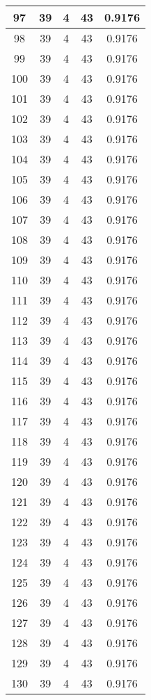 \documentclass[letterpaper, 12pt]{article}
\begin{document}
\begin{longtable}{|c|c|c|c|c|}
\hline
97 & 39 & 4 & 43 & 0.9176 \\
\hline
98 & 39 & 4 & 43 & 0.9176 \\
\hline
99 & 39 & 4 & 43 & 0.9176 \\
\hline
100 & 39 & 4 & 43 & 0.9176 \\
\hline
101 & 39 & 4 & 43 & 0.9176 \\
\hline
102 & 39 & 4 & 43 & 0.9176 \\
\hline
103 & 39 & 4 & 43 & 0.9176 \\
\hline
104 & 39 & 4 & 43 & 0.9176 \\
\hline
105 & 39 & 4 & 43 & 0.9176 \\
\hline
106 & 39 & 4 & 43 & 0.9176 \\
\hline
107 & 39 & 4 & 43 & 0.9176 \\
\hline
108 & 39 & 4 & 43 & 0.9176 \\
\hline
109 & 39 & 4 & 43 & 0.9176 \\
\hline
110 & 39 & 4 & 43 & 0.9176 \\
\hline
111 & 39 & 4 & 43 & 0.9176 \\
\hline
112 & 39 & 4 & 43 & 0.9176 \\
\hline
113 & 39 & 4 & 43 & 0.9176 \\
\hline
114 & 39 & 4 & 43 & 0.9176 \\
\hline
115 & 39 & 4 & 43 & 0.9176 \\
\hline
116 & 39 & 4 & 43 & 0.9176 \\
\hline
117 & 39 & 4 & 43 & 0.9176 \\
\hline
118 & 39 & 4 & 43 & 0.9176 \\
\hline
119 & 39 & 4 & 43 & 0.9176 \\
\hline
120 & 39 & 4 & 43 & 0.9176 \\
\hline
121 & 39 & 4 & 43 & 0.9176 \\
\hline
122 & 39 & 4 & 43 & 0.9176 \\
\hline
123 & 39 & 4 & 43 & 0.9176 \\
\hline
124 & 39 & 4 & 43 & 0.9176 \\
\hline
125 & 39 & 4 & 43 & 0.9176 \\
\hline
126 & 39 & 4 & 43 & 0.9176 \\
\hline
127 & 39 & 4 & 43 & 0.9176 \\
\hline
128 & 39 & 4 & 43 & 0.9176 \\
\hline
129 & 39 & 4 & 43 & 0.9176 \\
\hline
130 & 39 & 4 & 43 & 0.9176 \\

\end{longtable}
\end{document}
